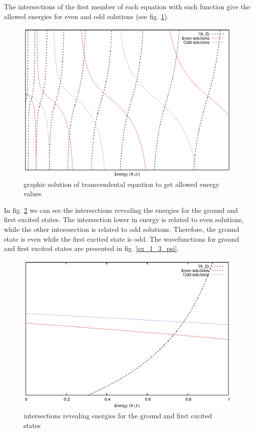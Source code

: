 \documentclass{article}
\begin{document}
The intersections of the first member of each equation with such function give the allowed energies for even and odd solutions (see fig. \ref{graph_sol_ex_1_3}).

\begin{figure}
\centering
\includegraphics{graph_sol_ex_1_3.eps}
\caption{graphic solution of transcendental equation to get allowed energy values}
\label{graph_sol_ex_1_3}
\end{figure}

In fig. \ref{ex_1_3_ground_energies} we can see the intersections revealing the energies for the ground and first excited states. The intersection lower in energy is related to even solutions, while the other interesection is related to odd solutions. Therefore, the ground state is even while the first excited state is odd. The wavefunctions for ground and first excited states are presented in fig. \ref{ex_1_3_psi}.

\begin{figure}
\centering
\includegraphics{ex_1_3_ground_energies.eps}
\caption{intersections revealing energies for the ground and first excited states}
\label{ex_1_3_ground_energies}
\end{figure}
\end{document}

